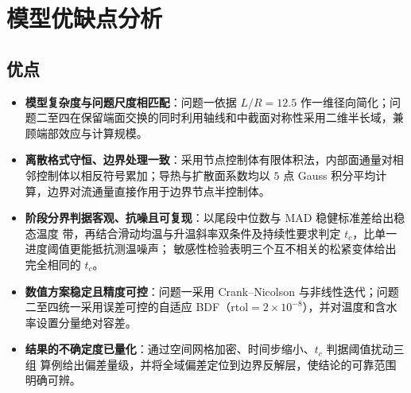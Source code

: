 \documentclass[12pt,a4paper]{ctexart}
\begin{document}
\section{模型优缺点分析}
\subsection{优点}
\begin{itemize}
    \item \textbf{模型复杂度与问题尺度相匹配}：问题一依据 $L/R=12.5$ 作一维径向简化；问题二至四在保留端面交换的同时利用轴线和中截面对称性采用二维半长域，兼顾端部效应与计算规模。

    \item \textbf{离散格式守恒、边界处理一致}：采用节点控制体有限体积法，内部面通量对相邻控制体以相反符号累加；导热与扩散面系数均以 $5$ 点 Gauss 积分平均计算，边界对流通量直接作用于边界节点半控制体。

    \item \textbf{阶段分界判据客观、抗噪且可复现}：以尾段中位数与 MAD 稳健标准差给出稳态温度
    带，再结合滑动均温与升温斜率双条件及持续性要求判定 $t_c$，比单一进度阈值更能抵抗测温噪声；
    敏感性检验表明三个互不相关的松紧变体给出完全相同的 $t_c$。

    \item \textbf{数值方案稳定且精度可控}：问题一采用 Crank--Nicolson 与非线性迭代；问题二至四统一采用误差可控的自适应 BDF（$\mathrm{rtol}=2\times10^{-8}$），并对温度和含水率设置分量绝对容差。

    \item \textbf{结果的不确定度已量化}：通过空间网格加密、时间步缩小、$t_c$ 判据阈值扰动三组
    算例给出偏差量级，并将全域偏差定位到边界反解层，使结论的可靠范围明确可辨。
\end{itemize}
\end{document}

